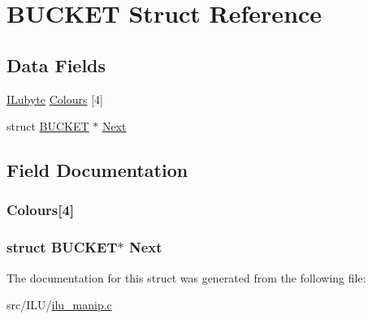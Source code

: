 \hypertarget{struct_b_u_c_k_e_t}{\section{B\-U\-C\-K\-E\-T Struct Reference}
\label{struct_b_u_c_k_e_t}
}
\subsection*{Data Fields}
\begin{DoxyCompactItemize}
\item 
\hyperlink{il_8h_a8d2f04500100a86d1b00e98ab1b15a33}{I\-Lubyte} \hyperlink{struct_b_u_c_k_e_t_a731f4c0c1277c2062ed469f64277cc53}{Colours} \mbox{[}4\mbox{]}
\item 
struct \hyperlink{struct_b_u_c_k_e_t}{B\-U\-C\-K\-E\-T} $\ast$ \hyperlink{struct_b_u_c_k_e_t_a27cea971bbb4245123d4d56f0429abaf}{Next}
\end{DoxyCompactItemize}


\subsection{Field Documentation}
\hypertarget{struct_b_u_c_k_e_t_a731f4c0c1277c2062ed469f64277cc53}{
\subsubsection[{Colours}]{ Colours\mbox{[}4\mbox{]}}}\label{struct_b_u_c_k_e_t_a731f4c0c1277c2062ed469f64277cc53}
\hypertarget{struct_b_u_c_k_e_t_a27cea971bbb4245123d4d56f0429abaf}{
\subsubsection[{Next}]{\setlength{\rightskip}{0pt plus 5cm}struct {\bf B\-U\-C\-K\-E\-T}$\ast$ Next}}\label{struct_b_u_c_k_e_t_a27cea971bbb4245123d4d56f0429abaf}


The documentation for this struct was generated from the following file\-:\begin{DoxyCompactItemize}
\item 
src/\-I\-L\-U/\hyperlink{ilu__manip_8c}{ilu\-\_\-manip.\-c}\end{DoxyCompactItemize}
